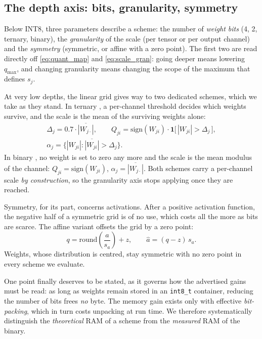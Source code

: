 \subsection{The depth axis: bits, granularity, symmetry}

Below INT8, three parameters describe a scheme: the number of \emph{weight bits} (4, 2, ternary, binary),
the \emph{granularity} of the scale (per tensor or per output channel) and the \emph{symmetry}
(symmetric, or affine with a zero point). The first two are read directly off \eqref{eq:quant_map} and
\eqref{eq:scale_gran}: going deeper means lowering $q_{\max}$, and changing granularity means changing
the scope of the maximum that defines $s_j$.

At very low depths, the linear grid gives way to two dedicated schemes, which we take as they stand. In
ternary \cite{Li2016TWN}, a per-channel threshold decides which weights survive, and the scale is the
mean of the surviving weights alone:
\begin{equation}
\label{eq:twn}
\begin{gathered}
\Delta_j = \num{0.7} \cdot \overline{|W_{j\cdot}|},
\qquad
Q_{ji} = \mathrm{sign}(W_{ji}) \cdot \mathbf{1}\bigl[\,|W_{ji}| > \Delta_j\,\bigr], \\[2pt]
\alpha_j = \overline{\bigl\{ |W_{ji}| : |W_{ji}| > \Delta_j \bigr\}} .
\end{gathered}
\end{equation}
In binary \cite{Rastegari2016XNOR}, no weight is set to zero any more and the scale is the mean modulus
of the channel: $Q_{ji} = \mathrm{sign}(W_{ji})$, $\alpha_j = \overline{|W_{j\cdot}|}$. Both schemes
carry a per-channel scale \emph{by construction}, so the granularity axis stops applying once they are
reached.

Symmetry, for its part, concerns activations. After a positive activation function, the negative half of
a symmetric grid is of no use, which costs all the more as bits are scarce. The affine variant offsets
the grid by a zero point:
\begin{equation}
\label{eq:affine_act}
q = \mathrm{round}\!\left(\frac{a}{s_a}\right) + z,
\qquad
\widehat{a} = (q - z)\, s_a .
\end{equation}
Weights, whose distribution is centred, stay symmetric with no zero point in every scheme we evaluate.

One point finally deserves to be stated, as it governs how the
advertised gains must be read: as long as weights remain stored in an \texttt{int8\_t} container, reducing
the number of bits frees \emph{no} byte. The memory gain exists only with effective \emph{bit-packing},
which in turn costs unpacking at run time. We therefore systematically distinguish the \emph{theoretical}
RAM of a scheme from the \emph{measured} RAM of the binary.

